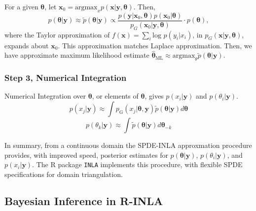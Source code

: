 For a given $\pmb{\theta}$, let $\pmb{x}_{0} = \text{argmax}_{x}p(\pmb{x}|\pmb{y},\pmb{\theta})$. Then,
$$ p(\pmb{\theta}|\pmb{y}) \approx \tilde{p}(\pmb{\theta}|\pmb{y}) \propto  \frac{p(\pmb{y} | \pmb{x}_{0}, \pmb{\theta}) p(\pmb{x}_{0} | \pmb{\theta})}{p_{G}(\pmb{x}_{0} | \pmb{y}, \pmb{\theta})} \cdot p(\pmb{\theta}),$$
where the Taylor approximation of $f(\pmb{x}) = \sum_{i} \text{log }p(y_{i}|x_{i})$, in $p_{G}(\pmb{x} | \pmb{y}, \pmb{\theta})$, expands about $\pmb{x}_{0}$. This approximation matches \cite{Tierney1986} Laplace approximation.  Then, we have approximate maximum likelihood estimate $\hat{\pmb{\theta}}_{\text{ML}} \approx \text{argmax}_{\theta} \tilde{p}(\pmb{\theta}|\pmb{y})$.

\subsubsection{Step 3, Numerical Integration} %
Numerical Integration over $\pmb{\theta}$, or elements of $\pmb{\theta}$, gives $p(x_{i}|\pmb{y})$ and $p(\theta_{i}|\pmb{y})$.
        $$ p(x_{j} | \pmb{y}) \approx \int p_{\text{G}}(x_{j}|\pmb{\theta, y})\tilde{p}(\pmb{\theta}|\pmb{y}) d\pmb{\theta} $$
        $$ p(\theta_{k} | \pmb{y}) \approx \int \tilde{p}(\pmb{\theta}|\pmb{y}) d\pmb{\theta}_{-k} $$

In summary, from a continuous domain the SPDE-INLA approxmation procedure provides, with improved speed, posterior estimates for $p(\pmb{\theta}|\pmb{y})$, $p(\theta_{i}|\pmb{y})$, and $p(x_{i}|\pmb{y})$. The R package \verb|INLA| implements this procedure, with flexible SPDE specifications for domain triangulation.

\subsection{Bayesian Inference in R-INLA}